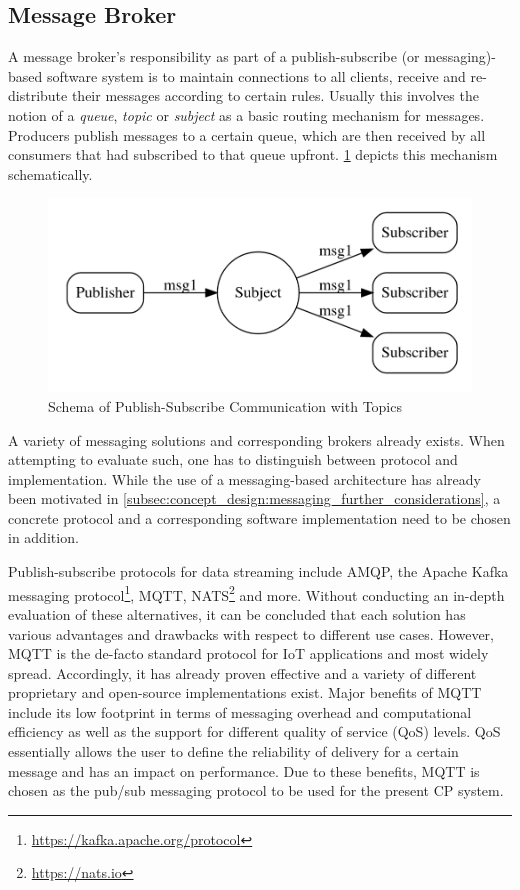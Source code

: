 \subsection{Message Broker}
\label{subsec:implementation:message_broker}
A message broker's responsibility as part of a publish-subscribe (or messaging)-based software system is to maintain connections to all clients, receive and re-distribute their messages according to certain rules. Usually this involves the notion of a \textit{queue}, \textit{topic} or \textit{subject} as a basic routing mechanism for messages. Producers publish messages to a certain queue, which are then received by all consumers that had subscribed to that queue upfront. \cref{fig:pubsub_topics} depicts this mechanism schematically. 

\begin{figure}
	\centering
	\includegraphics[width=0.7\linewidth]{98_images/pubsub}
	\caption[Schema of Publish-Subscribe Communication with Topics]{Schema of Publish-Subscribe Communication with Topics \cite{Collison2019}}
	\label{fig:pubsub_topics}
\end{figure}


A variety of messaging solutions and corresponding brokers already exists. When attempting to evaluate such, one has to distinguish between protocol and implementation. While the use of a messaging-based architecture has already been motivated in \cref{subsec:concept_design:messaging_further_considerations}, a concrete protocol and a corresponding software implementation need to be chosen in addition. 

Publish-subscribe protocols for data streaming include AMQP, the Apache Kafka messaging protocol\footnote{\url{https://kafka.apache.org/protocol}}, MQTT, NATS\footnote{\url{https://nats.io}} and more. Without conducting an in-depth evaluation of these alternatives, it can be concluded that each solution has various advantages and drawbacks with respect to different use cases. However, MQTT is the de-facto standard protocol for IoT applications and most widely spread. Accordingly, it has already proven effective and a variety of different proprietary and open-source implementations exist. Major benefits of MQTT include its low footprint in terms of messaging overhead and computational efficiency as well as the support for different quality of service (QoS) levels. QoS essentially allows the user to define the reliability of delivery for a certain message and has an impact on performance. Due to these benefits, MQTT is chosen as the pub/sub messaging protocol to be used for the present CP system. 

